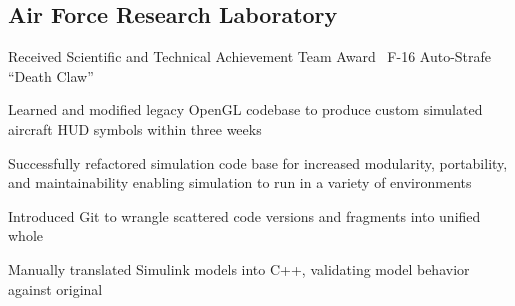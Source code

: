 \documentclass[letterpaper]{deedy-resume}
\newcommand{\experiencespace}{\vspace{2ex}}
\begin{document}
\begin{minipage}[t]{0.70\textwidth}
    \subsection{Air Force Research Laboratory}
    \begin{compactitem}
        \item Received Scientific and Technical Achievement Team Award \textemdash\ F-16 Auto-Strafe ``Death
            Claw''
        \item Learned and modified legacy OpenGL codebase to produce custom simulated aircraft HUD symbols
            within three weeks
        \item Successfully refactored simulation code base for increased modularity, portability, and
            maintainability enabling simulation to run in a variety of environments
        \item Introduced Git to wrangle scattered code versions and fragments into unified whole
        \item Manually translated Simulink models into C++, validating model behavior against original
    \end{compactitem}

    

\end{minipage}
\end{document}
